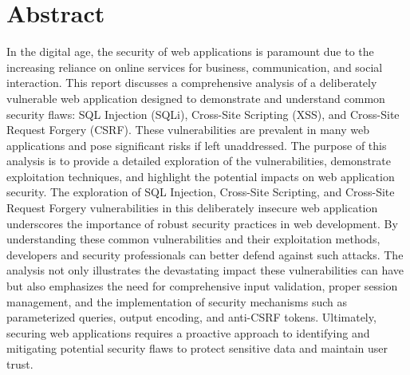\chapter*{Abstract}
In the digital age, the security of web applications is paramount due to the increasing reliance on online services for business, communication, and social interaction. This report discusses a comprehensive analysis of a deliberately vulnerable web application designed to demonstrate and understand common security flaws: SQL Injection (SQLi), Cross-Site Scripting (XSS), and Cross-Site Request Forgery (CSRF). These vulnerabilities are prevalent in many web applications and pose significant risks if left unaddressed. The purpose of this analysis is to provide a detailed exploration of the vulnerabilities, demonstrate exploitation techniques, and highlight the potential impacts on web application security.
The exploration of SQL Injection, Cross-Site Scripting, and Cross-Site Request Forgery vulnerabilities in this deliberately insecure web application underscores the importance of robust security practices in web development. By understanding these common vulnerabilities and their exploitation methods, developers and security professionals can better defend against such attacks. The analysis not only illustrates the devastating impact these vulnerabilities can have but also emphasizes the need for comprehensive input validation, proper session management, and the implementation of security mechanisms such as parameterized queries, output encoding, and anti-CSRF tokens. Ultimately, securing web applications requires a proactive approach to identifying and mitigating potential security flaws to protect sensitive data and maintain user trust.
